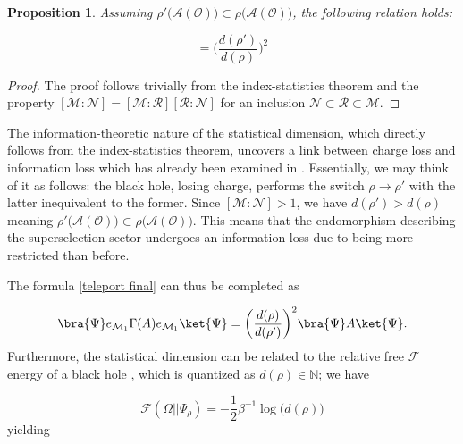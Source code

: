 \documentclass[a4paper,11pt]{article}
\newtheorem{Proposition}{Proposition}[subsection]
\begin{document}
\begin{Proposition}
    Assuming $\rho' \big( \mathcal{A}(\mathcal{O}) \big) \subset \rho \big( \mathcal{A}(\mathcal{O}) \big)$, the following relation holds:

    \begin{equation}
        [\rho \big( \mathcal{A}(\mathcal{O}) \big) : \rho' \big( \mathcal{A}(\mathcal{O}) \big)] = \bigg( \frac{d(\rho')}{d(\rho)} \bigg)^2
    \end{equation}
\end{Proposition}

\begin{proof}
    The proof follows trivially from the index-statistics theorem and the property $[\mathcal{M}:\mathcal{N}] = [\mathcal{M}:\mathcal{R}][\mathcal{R}:\mathcal{N}]$ for an inclusion $\mathcal{N} \subset \mathcal{R} \subset \mathcal{M}$.
\end{proof}

The information-theoretic nature of the statistical dimension, which directly follows from the index-statistics theorem, uncovers a link between charge loss and information loss which has already been examined in \cite{Longo2}. Essentially, we may think of it as follows: the black hole, losing charge, performs the switch $\rho \rightarrow \rho'$ with the latter inequivalent to the former. Since $[\mathcal{M}:\mathcal{N}] > 1$, we have $d(\rho') > d(\rho)$ meaning $\rho' \big( \mathcal{A} (\mathcal{O}) \big ) \subset \rho \big( \mathcal{A} (\mathcal{O}) \big )$. This means that the endomorphism describing the superselection sector undergoes an information loss due to being more restricted than before.

The formula \ref{teleport final} can thus be completed as

\begin{equation}
        \bra{\Psi} e_{\mathcal{M}_1} \Gamma (A) e_{\mathcal{M}_1} \ket{\Psi} = \bigg( \frac{d(\rho)}{d(\rho')} \bigg)^2 \bra{\Psi} A \ket{\Psi} \text{.}
    \label{teleport charge}
\end{equation}
%
Furthermore, the statistical dimension can be related to the relative free $\mathcal{F}$ energy of a black hole \cite{Longo2}, which is quantized as $d(\rho) \in \mathbb{N}$; we have

\begin{equation}
    \mathcal{F}(\Omega||\Psi_{\rho}) = - \frac{1}{2} \beta^{-1} \log \big( d(\rho) \big)
\end{equation}
%
yielding
\end{document}
